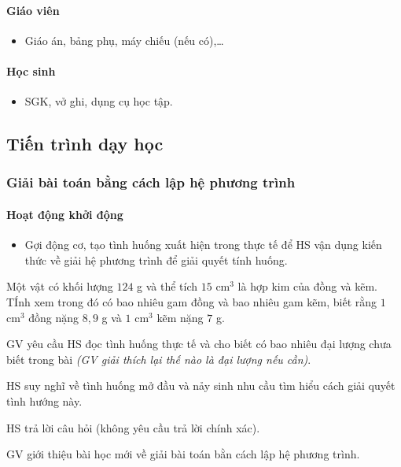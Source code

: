 \paragraph{Giáo viên}

\begin{itemize}
	\item Giáo án, bảng phụ, máy chiếu (nếu có),… 
\end{itemize}

\paragraph{Học sinh}

\begin{itemize}
	\item SGK, vở ghi, dụng cụ học tập.
\end{itemize}

\subsection{Tiến trình dạy học}

\danhsachtiet

\subsubsection{Giải bài toán bằng cách lập hệ phương trình}

\paragraph{Hoạt động khởi động}

\muctieu

\begin{itemize}
	\item Gợi động cơ, tạo tình huống xuất hiện trong thực tế để HS vận dụng kiến thức về giải hệ phương trình để giải quyết tính huống.
\end{itemize}

\noidungsanpham

\begin{modau}
	Một vật có khối lượng $124$ g và thể tích $15$ cm$^3$ là hợp kim của đồng và kẽm. TÍnh xem trong đó có bao nhiêu gam đồng và bao nhiêu gam kẽm, biết rằng $1$ cm$^3$ đồng nặng $8{,}9$ g và $1$ cm$^3$ kẽm nặng $7$ g.
\end{modau}

\tochucthuchien

\begin{tcth}
	\buocmot
	\item GV yêu cầu HS đọc tình huống thực tế và cho biết có bao nhiêu đại lượng chưa biết trong bài \textit{(GV giải thích lại thế nào là đại lượng nếu cần)}.
	\buochai
	\item HS suy nghĩ về tình huống mở đầu và nảy sinh nhu cầu tìm hiểu cách giải quyết tình hướng này.
	\buocba
	\item HS trả lời câu hỏi (không yêu cầu trả lời chính xác).
	\buocbon
	\item GV giới thiệu bài học mới về giải bài toán bằn cách lập hệ phương trình.
\end{tcth}

